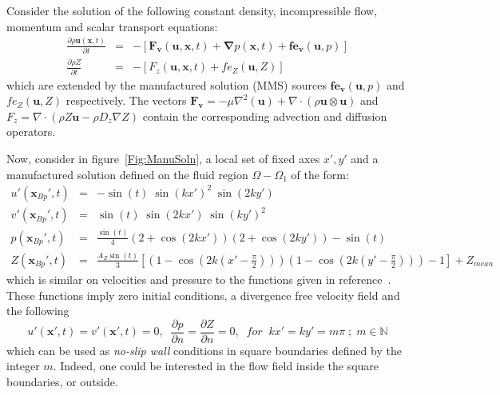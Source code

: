 \documentclass[11pt]{book}
\begin{document}
Consider the solution of the following constant density, incompressible flow, momentum and scalar transport equations:
%
\begin{eqnarray}
  \frac{\partial \rho \mathbf{u}(\mathbf{x},t)}{\partial t} &=& -\left[ \mathbf{F_v}(\mathbf{u},\mathbf{x},t) + \boldsymbol{\nabla} p(\mathbf{x},t) + \mathbf{fe_v}(\mathbf{u},p) \right] \label{eq:mmsMom} \\
  \frac{\partial \rho Z}{\partial t} &=& -\left[  F_z(\mathbf{u},\mathbf{x},t) +  fe_Z(\mathbf{u},Z)   \right]
  \label{eq:mmsZ}
\end{eqnarray}
%
which are extended by the manufactured solution (MMS) sources $\mathbf{fe_v}(\mathbf{u},p)$ and $fe_Z(\mathbf{u},Z)$ respectively. The vectors $\mathbf{F_v}=-\mu \nabla^2(\mathbf{u}) + \nabla \cdot \left( \rho \mathbf{u} \otimes \mathbf{u} \right)$ and $F_z= \nabla \cdot \left( \rho Z \mathbf{u} - \rho D_z \nabla Z \right) $ contain the corresponding advection and diffusion operators.

Now, consider in figure~\ref{Fig:ManuSoln}, a local set of fixed axes $x',y'$ and a manufactured solution defined on the fluid region $\Omega - \Omega_1$ of the form:
%
\begin{eqnarray}
   u'(\mathbf{x}_{Bp}',t) &=& -\sin(t) \; \sin(kx')^2 \; \sin(2ky') \label{eq:upmf} \\
   v'(\mathbf{x}_{Bp}',t) &=&   \sin(t) \; \sin(2kx') \; \sin(ky')^2 \label{eq:vpmf} \\
   p(\mathbf{x}_{Bp}',t) &=& \frac{\sin(t)}{4} \left( 2+\cos(2kx') \right) \left( 2+\cos(2ky') \right) - \sin(t) \label{eq:pmf} \\
   Z(\mathbf{x}_{Bp}',t) &=& \frac{A_Z \sin(t)}{3} \left[ \left( 1-\cos(2k(x'-\frac{\pi}{2})) \right)
                                                                                   \left( 1-\cos(2k(y'-\frac{\pi}{2})) \right) - 1 \right] + Z_{mean} \label{eq:qmf}
\end{eqnarray}
%
which is similar on velocities and pressure to the functions given in reference~\cite{E:CMS2003}.  These functions imply zero initial conditions, a divergence free velocity field and the following
%
\begin{equation}
   u'(\mathbf{x}',t)=v'(\mathbf{x}',t)=0, \; \; \frac{\partial p}{\partial n} = \frac{\partial Z}{\partial n}=0, \; \;
   for \; \; kx'=ky'= m \pi \; ; \; m \in \mathbb{N}
\end{equation}
%
which can be used as \textit{no-slip wall} conditions in square boundaries defined by the integer $m$. Indeed, one could be interested in the flow field inside the square boundaries, or outside.
\end{document}
